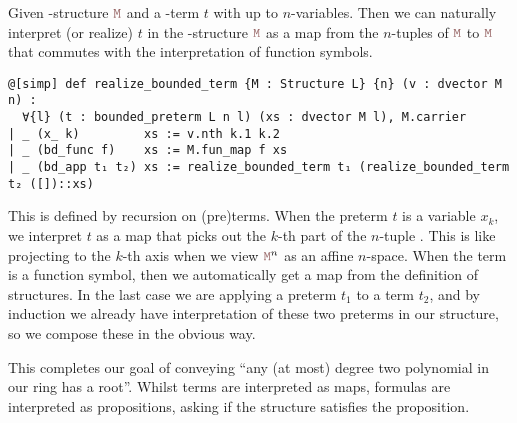 \begin{dfn}
    Given -structure $\code{M}$ and a -term $t$ with up to $n$-variables.
    Then we can naturally interpret (or realize) $t$ in the -structure $\code{M}$ as a
    map from the $n$-tuples of $\code{M}$ to $\code{M}$ that
    commutes with the interpretation of function symbols.

    \begin{lstlisting}
@[simp] def realize_bounded_term {M : Structure L} {n} (v : dvector M n) :
  ∀{l} (t : bounded_preterm L n l) (xs : dvector M l), M.carrier
| _ (x_ k)         xs := v.nth k.1 k.2
| _ (bd_func f)    xs := M.fun_map f xs
| _ (bd_app t₁ t₂) xs := realize_bounded_term t₁ (realize_bounded_term t₂ ([])::xs) \end{lstlisting}

    This is defined by recursion on (pre)terms.
    When the preterm $t$ is a variable $x_{k}$, we interpret $t$ as a map
    that picks out the $k$-th part of the $n$-tuple .
    This is like projecting to the $k$-th axis when we view $\code{M}^{n}$ as an affine $n$-space.
    When the term is a function symbol, then we automatically get a map from the
    definition of structures.
    In the last case we are applying a preterm $t_{1}$ to a term $t_{2}$,
    and by induction we already have interpretation of these two preterms
    in our structure, so we compose these in the obvious way.
\end{dfn}

This completes our goal of conveying
``any (at most) degree two polynomial in our ring has a root''.
Whilst terms are interpreted as maps, formulas are interpreted as propositions,
asking if the structure  satisfies the proposition.

